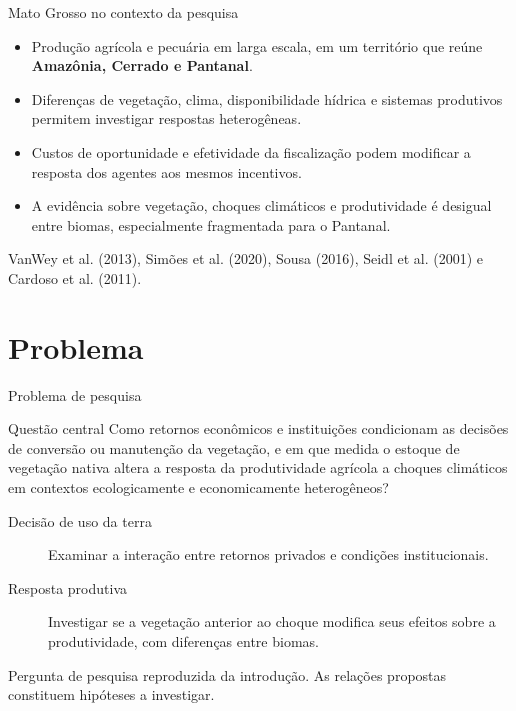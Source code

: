 \documentclass[aspectratio=169,11pt]{beamer}
\newcommand{\fonte}[1]{\par\vfill{\fontsize{7.5}{9}\selectfont\color{gray}#1\par}}
\begin{document}
\begin{frame}{Mato Grosso no contexto da pesquisa}
\begin{itemize}
\item Produção agrícola e pecuária em larga escala, em um território que reúne \textbf{Amazônia, Cerrado e Pantanal}.
\medskip
\item Diferenças de vegetação, clima, disponibilidade hídrica e sistemas produtivos permitem investigar respostas heterogêneas.
\medskip
\item Custos de oportunidade e efetividade da fiscalização podem modificar a resposta dos agentes aos mesmos incentivos.
\medskip
\item A evidência sobre vegetação, choques climáticos e produtividade é desigual entre biomas, especialmente fragmentada para o Pantanal.
\end{itemize}
\fonte{VanWey et al. (2013), Simões et al. (2020), Sousa (2016), Seidl et al. (2001) e Cardoso et al. (2011).}
\end{frame}

\section{Problema}
\begin{frame}{Problema de pesquisa}
\begin{block}{Questão central}
Como retornos econômicos e instituições condicionam as decisões de conversão ou manutenção da vegetação, e em que medida o estoque de vegetação nativa altera a resposta da produtividade agrícola a choques climáticos em contextos ecologicamente e economicamente heterogêneos?
\end{block}
\medskip
\begin{description}
\item[Decisão de uso da terra] Examinar a interação entre retornos privados e condições institucionais.
\medskip
\item[Resposta produtiva] Investigar se a vegetação anterior ao choque modifica seus efeitos sobre a produtividade, com diferenças entre biomas.
\end{description}
\fonte{Pergunta de pesquisa reproduzida da introdução. As relações propostas constituem hipóteses a investigar.}
\end{frame}
\end{document}

